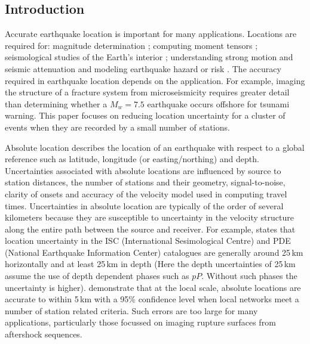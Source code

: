 \documentclass[12pt,double]{article}
\begin{document}



\vspace{2em}
\begin{centering}
\section*{Introduction} 
\end{centering}

Accurate earthquake location is important for many applications. Locations
are required for:  magnitude
determination \citep{dr_Richter35a, dr_Gutenberg45a};
computing moment tensors \citep{dr_Sipkin02a};
seismological studies of the Earth's interior
\citep{dr_Spencer80a, dr_Kennett95a, dr_Curtis02a, dr_Kennett04a};
understanding strong motion and seismic attenuation
\citep{dr_Toro97a, dr_Campbell03a}
 and modeling earthquake hazard or risk
\citep{dr_Frankel00a, dr_Stirling02a, dr_Robinson06b}.
The accuracy required in earthquake location depends on the
application. For example, imaging the structure of a fracture system
from microseismicity requires greater detail than determining
whether a $M_w=7.5$ earthquake occurs offshore for tsunami warning.
 This paper focuses on reducing location uncertainty for
a cluster of events when they are recorded by a small
number of stations.

Absolute location describes the location of an earthquake with
respect to a global reference such as latitude, longitude (or
easting/northing) and depth. Uncertainties associated with absolute
locations are influenced by source to station distances, the number
of stations and their geometry, signal-to-noise, clarity of onsets
and accuracy of the velocity model used in computing travel times.
Uncertainties in absolute location are typically of the order of
several kilometers because they are susceptible to uncertainty in
the velocity structure along the entire path between the source and
receiver. For example, \citet{dr_Shearer99a} states that location
uncertainty in the ISC (International Sesimological
Centre) and PDE (National Earthquake
Information
Center)
catalogues are generally around 25\,km horizontally and at least
25\,km in depth (Here the depth uncertainties of 25\,km
assume the use of depth dependent phases such as $pP$. Without such
phases the uncertainty is higher). \citet{dr_Bondar04a} demonstrate
that at the local scale, absolute locations are accurate to within
5\,km with a 95\% confidence level when local networks meet a number
of station related criteria. Such errors are too large for many
applications, particularly those focussed on imaging rupture
surfaces from aftershock sequences.
\end{document}
